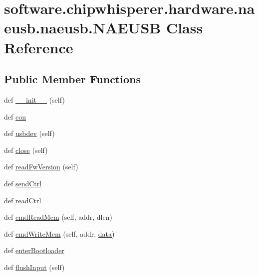 \hypertarget{classsoftware_1_1chipwhisperer_1_1hardware_1_1naeusb_1_1naeusb_1_1NAEUSB}{}\section{software.\+chipwhisperer.\+hardware.\+naeusb.\+naeusb.\+N\+A\+E\+U\+S\+B Class Reference}
\label{classsoftware_1_1chipwhisperer_1_1hardware_1_1naeusb_1_1naeusb_1_1NAEUSB}
\subsection*{Public Member Functions}
\begin{DoxyCompactItemize}
\item 
def \hyperlink{classsoftware_1_1chipwhisperer_1_1hardware_1_1naeusb_1_1naeusb_1_1NAEUSB_a402d150873a3e0db9324c1366910df5d}{\+\_\+\+\_\+init\+\_\+\+\_\+} (self)
\item 
def \hyperlink{classsoftware_1_1chipwhisperer_1_1hardware_1_1naeusb_1_1naeusb_1_1NAEUSB_a50259cc478ba084f863d8090ab3a72ef}{con}
\item 
def \hyperlink{classsoftware_1_1chipwhisperer_1_1hardware_1_1naeusb_1_1naeusb_1_1NAEUSB_a4cee25dcd50137094dc882f2c813f320}{usbdev} (self)
\item 
def \hyperlink{classsoftware_1_1chipwhisperer_1_1hardware_1_1naeusb_1_1naeusb_1_1NAEUSB_aae4d8eb3fa4474cc835c0540dc857036}{close} (self)
\item 
def \hyperlink{classsoftware_1_1chipwhisperer_1_1hardware_1_1naeusb_1_1naeusb_1_1NAEUSB_aec2d33ac1d0b1b9a20af1539c351d049}{read\+Fw\+Version} (self)
\item 
def \hyperlink{classsoftware_1_1chipwhisperer_1_1hardware_1_1naeusb_1_1naeusb_1_1NAEUSB_ab44395ff926edc6b1240d00d9ddf54e4}{send\+Ctrl}
\item 
def \hyperlink{classsoftware_1_1chipwhisperer_1_1hardware_1_1naeusb_1_1naeusb_1_1NAEUSB_a16fdd73ce29adbed5c82a180642d01c7}{read\+Ctrl}
\item 
def \hyperlink{classsoftware_1_1chipwhisperer_1_1hardware_1_1naeusb_1_1naeusb_1_1NAEUSB_a65d05a90fd4fa7eae5ffbf03cff3f4f2}{cmd\+Read\+Mem} (self, addr, dlen)
\item 
def \hyperlink{classsoftware_1_1chipwhisperer_1_1hardware_1_1naeusb_1_1naeusb_1_1NAEUSB_a50768c5a3e714db5a2f03108e13d0a40}{cmd\+Write\+Mem} (self, addr, \hyperlink{namespacesoftware_1_1chipwhisperer_1_1hardware_1_1naeusb_1_1naeusb_a490446b9215f63f77a4abed9b8009220}{data})
\item 
def \hyperlink{classsoftware_1_1chipwhisperer_1_1hardware_1_1naeusb_1_1naeusb_1_1NAEUSB_a76e72555309c57192d024d2325073953}{enter\+Bootloader}
\item 
def \hyperlink{classsoftware_1_1chipwhisperer_1_1hardware_1_1naeusb_1_1naeusb_1_1NAEUSB_ac0098b00e80aecffe450214ae0d4acb3}{flush\+Input} (self)
\end{DoxyCompactItemize}
